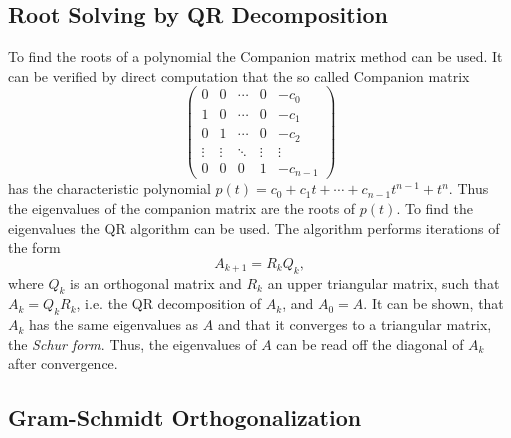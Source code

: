 \documentclass{article}
\begin{document}
\subsection*{Root Solving by QR Decomposition}

To find the roots of a polynomial the Companion matrix method can be used. It can be verified by direct computation that the so called Companion matrix
$$\left(\begin{array}{ccccc}0 & 0 & \cdots & 0 & -c_0 \\1 & 0 & \cdots & 0 & -c_1 \\0 & 1 & \cdots & 0 & -c_2 \\\vdots & \vdots & \ddots & \vdots & \vdots \\0 & 0 & 0 & 1 & -c_{n-1}\end{array}\right)$$
has the characteristic polynomial $p(t)=c_0+c_1 t + \cdots + c_{n-1} t^{n-1} + t^n$. Thus the eigenvalues of the companion matrix are the roots of $p(t)$. To find the eigenvalues the QR algorithm can be used. The algorithm performs iterations of the form
$$A_{k+1} = R_{k} Q_{k},$$ 
where $Q_k$ is an orthogonal matrix and $R_k$ an upper triangular matrix, such that $A_k = Q_k R_k$, i.e. the QR decomposition of $A_k$, and $A_0=A$. It can be shown, that $A_k$ has the same eigenvalues as $A$ and that it converges to a triangular matrix, the {\it Schur form}.  Thus, the eigenvalues of $A$ can be read off the diagonal of $A_k$ after convergence.

\subsection*{Gram-Schmidt Orthogonalization}
\end{document}
